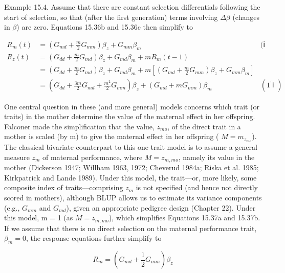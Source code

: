 \documentclass{article}
\begin{document}
Example 15.4. Assume that there are constant selection differentials following the start of selection, so that (after the first generation) terms involving  $ \Delta\beta $ (changes in  $ \beta $) are zero. Equations 15.36b and 15.36c then simplify to

\begin{equation}
\begin{aligned}R_{m}(t)&=\left(G_{md}+\frac{m}{2}G_{mm}\right)\beta_{z}+G_{mm}\beta_{m}&(\text{ⅰ }\\R_{z}(t)&=\left(G_{dd}+\frac{m}{2}G_{md}\right)\beta_{z}+G_{md}\beta_{m}+mR_{m}(t-1)\\&=\left(G_{dd}+\frac{m}{2}G_{md}\right)\beta_{z}+G_{md}\beta_{m}+m\left[\left(G_{md}+\frac{m}{2}G_{mm}\right)\beta_{z}+G_{mm}\beta_{m}\right]\\&=\left(G_{dd}+\frac{3m}{2}G_{md}+\frac{m^{2}}{2}G_{mm}\right)\beta_{z}+\left(G_{md}+mG_{mm}\right)\beta_{m}&(1^{\prime}\text{ⅰ })\end{aligned}
\tag{15.37b}
\label{eq:15_37b}
\end{equation}

One central question in these (and more general) models concerns which trait (or traits) in the mother determine the value of the maternal effect in her offspring. Falconer made the simplification that the value,  $ z_{mo} $, of the direct trait in a mother is scaled (by m) to give the maternal effect in her offspring ( $ M = m_{z_{mo}} $). The classical bivariate counterpart to this one-trait model is to assume a general measure  $ z_{m} $ of maternal performance, where  $ M = z_{m,mo} $, namely its value in the mother (Dickerson 1947; Willham 1963, 1972; Cheverud 1984a; Riska et al. 1985; Kirkpatrick and Lande 1989). Under this model, the trait—or, more likely, some composite index of traits—comprising  $ z_{m} $ is not specified (and hence not directly scored in mothers), although BLUP allows us to estimate its variance components (e.g.,  $ G_{mm} $ and  $ G_{md} $), given an appropriate pedigree design (Chapter 22). Under this model, m = 1 (as  $ M = z_{m,mo} $), which simplifies Equations 15.37a and 15.37b. If we assume that there is no direct selection on the maternal performance trait,  $ \beta_{m} = 0 $, the response equations further simplify to

\begin{equation}
R_{m}=\left(G_{md}+\frac{1}{2}G_{mm}\right)\beta_{z}
\tag{15.38a}
\label{eq:15_38a}
\end{equation}
\end{document}
